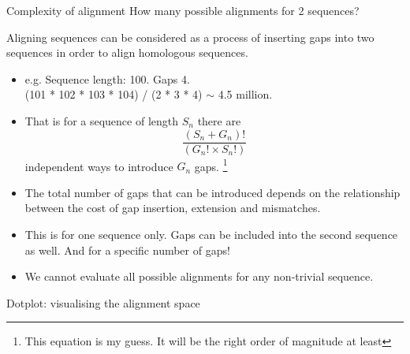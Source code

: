 \documentclass[pdf]{beamer}
\begin{document}
\begin{frame}{Complexity of alignment}
  How many possible alignments for 2 sequences?

  Aligning sequences can be considered as a process of inserting gaps into two
  sequences in order to align homologous sequences.
  \pause
  \begin{itemize}
    \item e.g. Sequence length: 100. Gaps 4.\\
      (101 * 102 * 103 * 104) / (2 * 3 * 4) $\sim$ 4.5 million.
      \pause
    \item That is for a sequence of length $S_n$ there are
      $$ \frac{(S_n + G_n)!}{(G_n! \times S_n!)} $$
      independent ways to introduce $G_n$ gaps.
      \footnote{This equation is my guess. It will be the right order of
        magnitude at least}
      \pause
    \item The total number of gaps that can be introduced depends
      on the relationship between the cost of gap insertion, extension and mismatches.
      \pause
    \item This is for one sequence only. Gaps can be included into the second
      sequence as well. And for a specific number of gaps!
    \item We cannot evaluate all possible alignments for any non-trivial sequence.
  \end{itemize}
    
\end{frame}

\begin{frame}{Dotplot: visualising the alignment space}
  \begin{figure}[ht]
    \begin{tikzpicture}[scale=0.5]
      
    \end{tikzpicture}
  \end{figure}

\end{frame}
\end{document}
